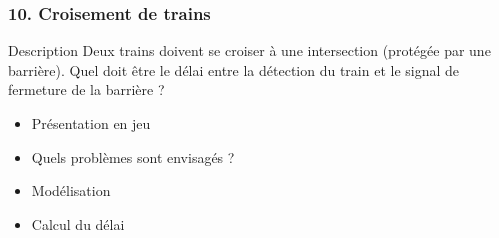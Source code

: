\documentclass[french]{beamer}
\begin{document}
\begin{frame}
  \frametitle{10. Croisement de trains}
  \begin{block}{Description}
  Deux trains doivent se croiser à une intersection (protégée par une barrière).
  Quel doit être le délai entre la détection du train et
  le signal de fermeture de la barrière ? 
  \end{block}

  \begin{itemize}
  \item Présentation en jeu
  \item Quels problèmes sont envisagés ?
  \item Modélisation
  \item Calcul du délai
  \end{itemize}
\end{frame}
\end{document}
